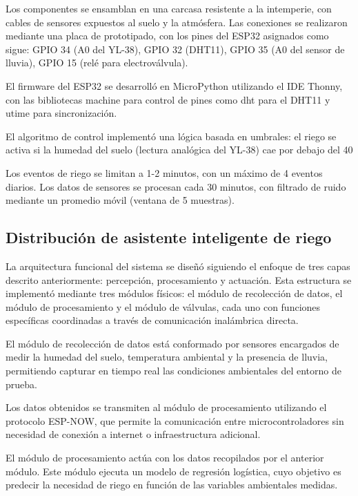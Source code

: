 \documentclass[pdflatex,sn-mathphys-num]{sn-jnl}%
\theoremstyle{thmstyleone}%
\theoremstyle{thmstyletwo}%
\theoremstyle{thmstylethree}%
\begin{document}
Los componentes se ensamblan en una carcasa resistente a la intemperie, con cables de sensores expuestos al suelo y la atmósfera. Las conexiones se realizaron mediante una placa de prototipado, con los pines del ESP32 asignados como sigue: GPIO 34 (A0 del YL-38), GPIO 32 (DHT11), GPIO 35 (A0 del sensor de lluvia), GPIO 15 (relé para electroválvula).

El firmware del ESP32 se desarrolló en MicroPython utilizando el IDE Thonny, con las bibliotecas machine para control de pines como dht para el DHT11 y utime para sincronización. 

El algoritmo de control implementó una lógica basada en umbrales: el riego se activa si la humedad del suelo (lectura analógica del YL-38) cae por debajo del 40%

Los eventos de riego se limitan a 1-2 minutos, con un máximo de 4 eventos diarios. Los datos de sensores se procesan cada 30 minutos, con filtrado de ruido mediante un promedio móvil (ventana de 5 muestras).

\subsection{Distribución de asistente inteligente de riego}
La arquitectura funcional del sistema se diseñó siguiendo el enfoque de tres capas descrito anteriormente: percepción, procesamiento y actuación. Esta estructura se implementó mediante tres módulos físicos: el módulo de recolección de datos, el módulo de procesamiento y el módulo de válvulas, cada uno con funciones específicas coordinadas a través de comunicación inalámbrica directa.

El módulo de recolección de datos está conformado por sensores encargados de medir la humedad del suelo, temperatura ambiental y la presencia de lluvia, permitiendo capturar en tiempo real las condiciones ambientales del entorno de prueba.

Los datos obtenidos se transmiten al módulo de procesamiento utilizando el protocolo ESP-NOW, que permite la comunicación entre microcontroladores sin necesidad de conexión a internet o infraestructura adicional.

El módulo de procesamiento actúa con los datos recopilados por el anterior módulo. Este módulo ejecuta un modelo de regresión logística, cuyo objetivo es predecir la necesidad de riego en función de las variables ambientales medidas. 
\end{document}
